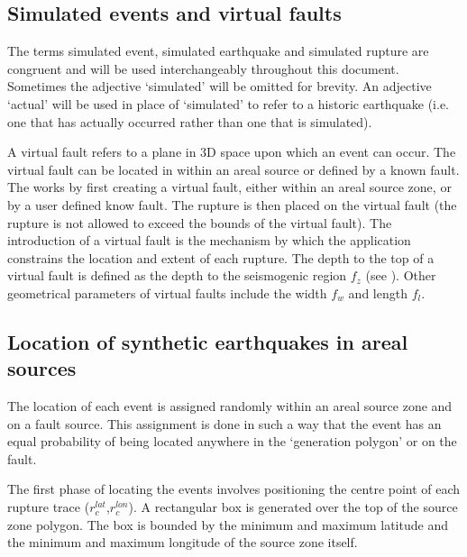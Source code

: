 \subsection{Simulated events and virtual faults}

The terms simulated event, simulated
earthquake and simulated
rupture are congruent and will be used
interchangeably throughout this document. Sometimes the adjective
`simulated' will be omitted for brevity. An adjective `actual'
will be used in place of `simulated' to refer to a historic
earthquake (i.e. one that has actually occurred rather than one
that is simulated).

A virtual fault refers to a plane in 3D space upon which an event can
occur.  The virtual fault can be located in within an areal source or defined by a known fault. 
The  works by first creating a virtual fault, either within an
areal source zone, or by a user defined know fault. The rupture is then placed 
on the virtual fault (the
rupture is not allowed to exceed the bounds of the virtual
fault). The introduction of a virtual
fault is the mechanism by which the
 application constrains the location and extent
of each rupture. The depth to the top of a virtual
fault is defined as the depth to the
seismogenic region $f_z$ (see
). Other geometrical parameters
of virtual faults include the width $f_w$ and
length $f_l$. 


\subsection{Location of synthetic earthquakes in areal sources}
\label{sec:rup-location}

The location of each event is assigned randomly within an areal source zone 
and on a fault source. 
This assignment is done in such a way that the event has
an equal probability of being located anywhere in the `generation
polygon' or on the fault. 

The first phase of locating the events involves positioning the
centre point of each rupture trace ($r_c^{lat}$,$r_c^{lon}$). A
rectangular box is generated over the top of the source zone polygon. The
box is bounded by the minimum and maximum latitude and the
minimum and maximum longitude of the source zone itself. 

